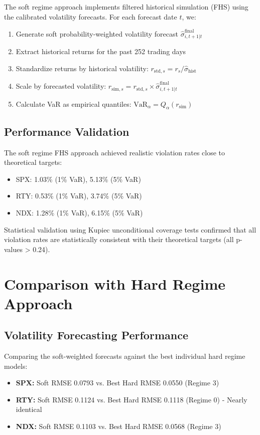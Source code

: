 The soft regime approach implements filtered historical simulation (FHS) using the calibrated volatility forecasts. For each forecast date $t$, we:

\begin{enumerate}
    \item Generate soft probability-weighted volatility forecast $\hat{\sigma}_{i,t+1|t}^{\text{final}}$
    \item Extract historical returns for the past 252 trading days
    \item Standardize returns by historical volatility: $r_{\text{std},s} = r_s / \hat{\sigma}_{\text{hist}}$
    \item Scale by forecasted volatility: $r_{\text{sim},s} = r_{\text{std},s} \times \hat{\sigma}_{i,t+1|t}^{\text{final}}$
    \item Calculate VaR as empirical quantiles: $\text{VaR}_\alpha = Q_\alpha(r_{\text{sim}})$
\end{enumerate}

\subsection{Performance Validation}

The soft regime FHS approach achieved realistic violation rates close to theoretical targets:
\begin{itemize}
    \item SPX: 1.03\% (1\% VaR), 5.13\% (5\% VaR)
    \item RTY: 0.53\% (1\% VaR), 3.74\% (5\% VaR)
    \item NDX: 1.28\% (1\% VaR), 6.15\% (5\% VaR)
\end{itemize}

Statistical validation using Kupiec unconditional coverage tests confirmed that all violation rates are statistically consistent with their theoretical targets (all p-values > 0.24).

\section{Comparison with Hard Regime Approach}

\subsection{Volatility Forecasting Performance}

Comparing the soft-weighted forecasts against the best individual hard regime models:
\begin{itemize}
    \item \textbf{SPX:} Soft RMSE 0.0793 vs. Best Hard RMSE 0.0550 (Regime 3)
    \item \textbf{RTY:} Soft RMSE 0.1124 vs. Best Hard RMSE 0.1118 (Regime 0) - Nearly identical
    \item \textbf{NDX:} Soft RMSE 0.1103 vs. Best Hard RMSE 0.0568 (Regime 3)
\end{itemize}

